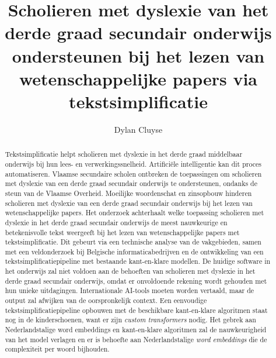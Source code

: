 \documentclass{hogent-article}
\title{Scholieren met dyslexie van het derde graad secundair onderwijs ondersteunen bij het lezen van wetenschappelijke papers via tekstsimplificatie}
\author{Dylan Cluyse}
\begin{document}
\begin{abstract}
Tekstsimplificatie helpt scholieren met dyslexie in het derde graad middelbaar onderwijs bij hun lees- en verwerkingssnelheid. Artificiële intelligentie kan dit proces automatiseren. Vlaamse secundaire scholen ontbreken de toepassingen om scholieren met dyslexie van een derde graad secundair onderwijs te ondersteunen, ondanks de steun van de Vlaamse Overheid. Moeilijke woordenschat en zinsopbouw hinderen scholieren met dyslexie van een derde graad secundair onderwijs bij het lezen van wetenschappelijke papers. Het onderzoek achterhaalt welke toepassing scholieren met dyslexie in het derde graad secundair onderwijs de meest nauwkeurige en betekenisvolle tekst weergeeft bij het lezen van wetenschappelijke papers met tekstsimplificatie. Dit gebeurt via een technische analyse van de vakgebieden, samen met een veldonderzoek bij Belgische informaticabedrijven en de ontwikkeling van een tekstsimplificatiepipeline met bestaande kant-en-klare modellen. De huidige software in het onderwijs zal niet voldoen aan de behoeften van scholieren met dyslexie in het derde graad secundair onderwijs, omdat er onvoldoende rekening wordt gehouden met hun unieke uitdagingen. Internationale AI-tools moeten worden vertaald, maar de output zal afwijken van de oorspronkelijk context. Een eenvoudige tekstsimplificatiepipeline opbouwen met de beschikbare kant-en-klare algoritmen staat nog in de kinderschoenen, want er zijn \textit{custom transformers} nodig. Het gebrek aan Nederlandstalige word embeddings en kant-en-klare algoritmen zal de nauwkeurigheid van het model verlagen en er is behoefte aan Nederlandstalige \textit{word embeddings} die de complexiteit per woord bijhouden.
\end{abstract}

\tableofcontents



\printbibliography[heading=bibintoc]
\end{document}
